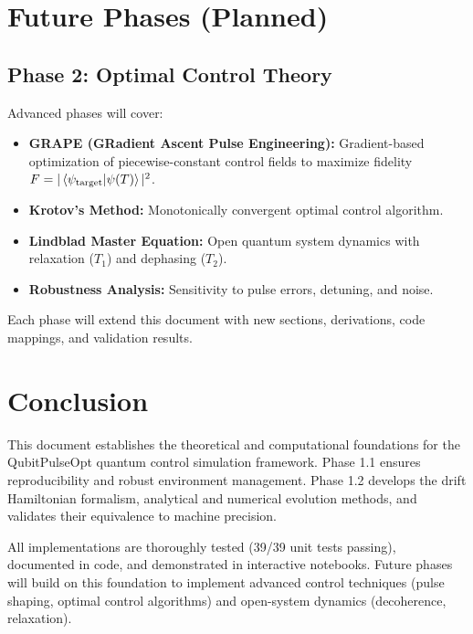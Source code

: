 \documentclass[11pt,a4paper]{article}
\theoremstyle{definition}
\theoremstyle{remark}
\begin{document}
\section{Future Phases (Planned)}

\subsection{Phase 2: Optimal Control Theory}

Advanced phases will cover:

\begin{itemize}
    \item \textbf{GRAPE (GRadient Ascent Pulse Engineering):} Gradient-based optimization of piecewise-constant control fields to maximize fidelity $F = |\braket{\psi_{\text{target}}}{\psi(T)}|^2$.
    \item \textbf{Krotov's Method:} Monotonically convergent optimal control algorithm.
    \item \textbf{Lindblad Master Equation:} Open quantum system dynamics with relaxation ($T_1$) and dephasing ($T_2$).
    \item \textbf{Robustness Analysis:} Sensitivity to pulse errors, detuning, and noise.
\end{itemize}

Each phase will extend this document with new sections, derivations, code mappings, and validation results.

\section{Conclusion}

This document establishes the theoretical and computational foundations for the QubitPulseOpt quantum control simulation framework. Phase 1.1 ensures reproducibility and robust environment management. Phase 1.2 develops the drift Hamiltonian formalism, analytical and numerical evolution methods, and validates their equivalence to machine precision.

All implementations are thoroughly tested (39/39 unit tests passing), documented in code, and demonstrated in interactive notebooks. Future phases will build on this foundation to implement advanced control techniques (pulse shaping, optimal control algorithms) and open-system dynamics (decoherence, relaxation).
\end{document}
